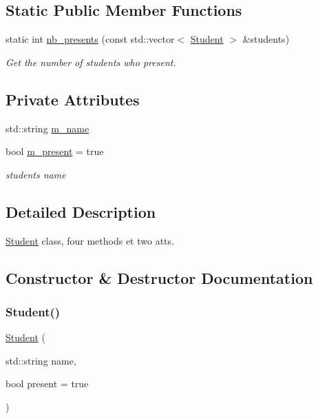 \subsection*{Static Public Member Functions}
\begin{DoxyCompactItemize}
\item 
static int \hyperlink{classStudent_ac8e5bc83d3632e30a849bf0163350d7b}{nb\+\_\+presents} (const std\+::vector$<$ \hyperlink{classStudent}{Student} $>$ \&students)
\begin{DoxyCompactList}\small\item\em Get the number of students who present. \end{DoxyCompactList}\end{DoxyCompactItemize}
\subsection*{Private Attributes}
\begin{DoxyCompactItemize}
\item 
std\+::string \hyperlink{classStudent_adb41893ba19e889e56c559f25fc1a68a}{m\+\_\+name}
\item 
bool \hyperlink{classStudent_a2614877b81d48e893c3ecd519278bbd7}{m\+\_\+present} = true
\begin{DoxyCompactList}\small\item\em student\textquotesingle{}s name \end{DoxyCompactList}\end{DoxyCompactItemize}


\subsection{Detailed Description}
\hyperlink{classStudent}{Student} class, four methods et two atts. 

\subsection{Constructor \& Destructor Documentation}
\mbox{\label{classStudent_ababb9f66a55e7ad87a5c5a6be6dda069}} 
\subsubsection{\texorpdfstring{Student()}{Student()}}
{\footnotesize\ttfamily \hyperlink{classStudent}{Student} (\begin{DoxyParamCaption}\item[{std\+::string}]{name,  }\item[{bool}]{present = {\ttfamily true} }\end{DoxyParamCaption})}



